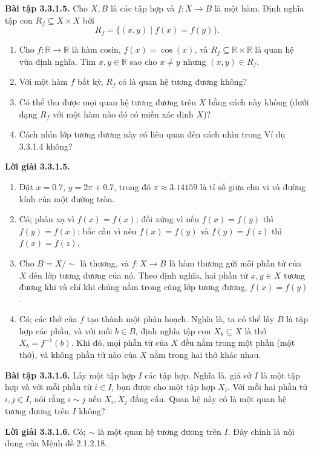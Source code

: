\noindent\textbf{Bài tập 3.3.1.5.} Cho $X,B$ là các tập hợp và $f:X\to B$ là một hàm. Định nghĩa tập con $R_f\subseteq X\times X$ bởi
\[R_f=\{(x,y)\mid f(x)=f(y)\}.\]
\begin{enumerate}[label=\alph*.]
\item Cho $f:\mathbb R\to\mathbb R$ là hàm cosin, $f(x)=\cos(x)$, và $R_f\subseteq\mathbb R\times\mathbb R$ là quan hệ vừa định nghĩa. Tìm $x,y\in\mathbb R$ sao cho $x\ne y$ nhưng $(x,y)\in R_f$.
\item Với một hàm $f$ bất kỳ, $R_f$ có là quan hệ tương đương không?
\item Có thể thu được mọi quan hệ tương đương trên $X$ bằng cách này không (dưới dạng $R_f$ với một hàm nào đó có miền xác định $X$)?
\item Cách nhìn lớp tương đương này có liên quan đến cách nhìn trong Ví dụ 3.3.1.4 không?
\end{enumerate}
\noindent\textbf{Lời giải 3.3.1.5.}\keepwithnext
\begin{enumerate}[label=\alph*.]
\item Đặt $x=0.7$, $y=2\pi+0.7$, trong đó $\pi\approx3.14159$ là tỉ số giữa chu vi và đường kính của một đường tròn.
\item Có; phản xạ vì $f(x)=f(x)$; đối xứng vì nếu $f(x)=f(y)$ thì $f(y)=f(x)$; bắc cầu vì nếu $f(x)=f(y)$ và $f(y)=f(z)$ thì $f(x)=f(z)$.
\item Cho $B=X/{\sim}$ là thương, và $f:X\to B$ là hàm thương gửi mỗi phần tử của $X$ đến lớp tương đương của nó. Theo định nghĩa, hai phần tử $x,y\in X$ tương đương khi và chỉ khi chúng nằm trong cùng lớp tương đương, $f(x)=f(y)$.
\item Có; các thớ của $f$ tạo thành một phân hoạch. Nghĩa là, ta có thể lấy $B$ là tập hợp các phần, và với mỗi $b\in B$, định nghĩa tập con $X_b\subseteq X$ là thớ $X_b=f^{-1}(b)$. Khi đó, mọi phần tử của $X$ đều nằm trong một phần (một thớ), và không phần tử nào của $X$ nằm trong hai thớ khác nhau.
\end{enumerate}

\noindent\textbf{Bài tập 3.3.1.6.} Lấy một tập hợp $I$ các tập hợp. Nghĩa là, giả sử $I$ là một tập hợp và với mỗi phần tử $i\in I$, bạn được cho một tập hợp $X_i$. Với mỗi hai phần tử $i,j\in I$, nói rằng $i\sim j$ nếu $X_i,X_j$ đẳng cấu. Quan hệ này có là một quan hệ tương đương trên $I$ không?

\noindent\textbf{Lời giải 3.3.1.6.} Có; $\sim$ là một quan hệ tương đương trên $I$. Đây chính là nội dung của Mệnh đề 2.1.2.18.

